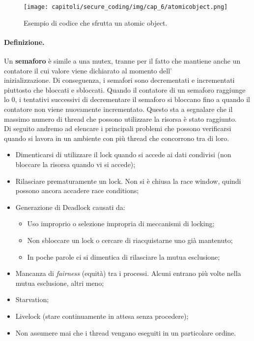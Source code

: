 \begin{figure}[H]
    \centering
    \texttt{[image: capitoli/secure\_coding/img/cap\_6/atomicobject.png]}
    \caption{Esempio di codice che sfrutta un atomic object.}
\end{figure}

\paragraph{Definizione.}
Un \textbf{semaforo} è simile a una mutex, tranne per il fatto che
mantiene anche un contatore il cui valore viene dichiarato al momento dell'\\inizializzazione.
Di conseguenza, i semafori sono decrementati e incrementati piuttosto che bloccati e sbloccati.
Quando il contatore di un semaforo raggiunge lo 0, i tentativi successivi di decrementare
il semaforo si bloccano fino a quando il contatore non viene nuovamente incrementato.
Questo sta a segnalare che il massimo numero di thread che possono utilizzare la risorsa è
stato raggiunto.\ \\


Di seguito andremo ad elencare i principali problemi che possono verificarsi quando si lavora
in un ambiente con più thread che concorrono tra di loro.

\begin{itemize}
    \item Dimenticarsi di utilizzare il lock quando si accede ai dati condivisi
          (non bloccare la risorsa quando vi si accede);
    \item Rilasciare prematuramente un lock. Non si è chiusa la race window, quindi
          possono ancora accadere race conditions;
    \item Generazione di Deadlock causati da:
          \begin{itemize}
              \item Uso improprio o selezione impropria di meccanismi di locking;
              \item Non sbloccare un lock o cercare di riacquistarne uno già mantenuto;
              \item In poche parole ci si dimentica di rilasciare la mutua esclusione;
          \end{itemize}
    \item Mancanza di \textit{fairness} (equità) tra i processi.
          Alcuni entrano più volte nella mutua esclusione, altri meno;
    \item Starvation;
    \item Livelock (stare continuamente in attesa senza procedere);
    \item Non assumere mai che i thread vengano eseguiti in un particolare ordine.
\end{itemize}

